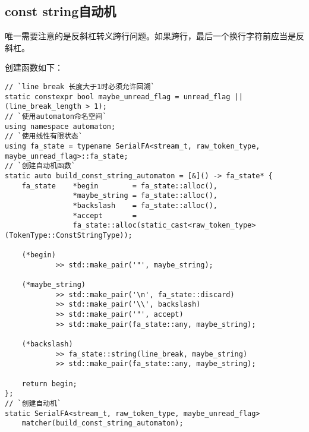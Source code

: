 \documentclass[UTF8]{ctexart}
\newcommand{\fira}[1]{{\firacode {}#1}}
\begin{document}
\subsection{const string自动机}
\begin{figure}[!h]
    \centering
\end{figure}

\par 唯一需要注意的是反斜杠转义跨行问题。如果跨行，最后一个换行字符前应当是反斜杠。

\par 创建函数如下：

{\firacode
\begin{lstlisting}[language={[ANSI]C++}]
// `line break 长度大于1时必须允许回溯`
static constexpr bool maybe_unread_flag = unread_flag || (line_break_length > 1);
// `使用automaton命名空间`
using namespace automaton;
// `使用线性有限状态`
using fa_state = typename SerialFA<stream_t, raw_token_type, maybe_unread_flag>::fa_state;
// `创建自动机函数`
static auto build_const_string_automaton = [&]() -> fa_state* {
    fa_state    *begin        = fa_state::alloc(),
                *maybe_string = fa_state::alloc(),
                *backslash    = fa_state::alloc(),
                *accept       =
                fa_state::alloc(static_cast<raw_token_type>(TokenType::ConstStringType));
    
    (*begin)
            >> std::make_pair('"', maybe_string);
    
    (*maybe_string)
            >> std::make_pair('\n', fa_state::discard)
            >> std::make_pair('\\', backslash)
            >> std::make_pair('"', accept)
            >> std::make_pair(fa_state::any, maybe_string);
            
    (*backslash)
            >> fa_state::string(line_break, maybe_string)
            >> std::make_pair(fa_state::any, maybe_string);

    return begin;
};
// `创建自动机`
static SerialFA<stream_t, raw_token_type, maybe_unread_flag>
    matcher(build_const_string_automaton);
\end{lstlisting}
}
\end{document}
